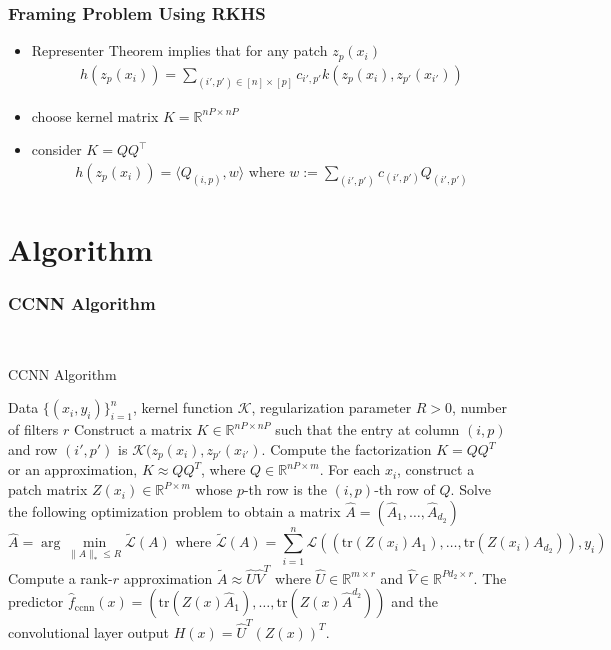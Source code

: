 \documentclass[hyperref={colorlinks}]{beamer}
\newcommand{\set}[1]{\mathbb{#1}}
\newcommand{\trace}[1]{\mathrm{tr}\left(#1\right)}
\begin{document}
\begin{frame}
	\frametitle{Framing Problem Using RKHS}
	\begin{itemize}
		\item Representer Theorem implies that for any patch $z_p(x_i)$
		\begin{align*}
			h(z_p(x_i))=\sum\limits_{(i',p')\in[n]\times[p]} c_{i',p'}k(z_p(x_i),z_{p'}(x_{i'}))
		\end{align*}
		\item choose kernel matrix $K=\mathbb{R}^{nP\times nP}$
		\item consider $K=QQ^{\top}$
		\begin{align*}
			h(z_p(x_i))=\langle Q_{(i,p)},w \rangle \text{ where } w:=\sum\limits_{(i',p')} c_{(i',p')}Q_{(i',p')}
		\end{align*}
	\end{itemize}
\end{frame}

\section{Algorithm}
\begin{frame}
	\frametitle{CCNN Algorithm}
	~
	\begin{algorithm}[H]
		\caption{CCNN Algorithm}
		\label{alg:ccnn-algorithm}
		\footnotesize
		\begin{algorithmic}[1]
			\REQUIRE Data $\{(x_i, y_i)\}_{i = 1}^n$, kernel function $\mathcal{K}$, regularization parameter $R > 0$, number of filters $r$
			\STATE Construct a matrix $K \in \set{R}^{nP \times nP}$ such that the entry at column $(i, p)$ and row $(i', p')$ is $\mathcal{K}(z_p(x_i), z_{p'}(x_{i'})$. Compute the factorization $K = QQ^T$ or an approximation, $K \approx QQ^T$, where $Q \in \set{R}^{nP \times m}$.
			\STATE For each $x_i$, construct a patch matrix $Z(x_i) \in \set{R}^{P \times m}$ whose $p$-th row is the $(i, p)$-th row of $Q$.
			\STATE Solve the following optimization problem to obtain a matrix $\hat{A} = (\hat{A}_1, \ldots, \hat{A}_{d_2})$
			$$\hat{A} = \arg \min_{\|A\|_* \leq R} \tilde{\mathcal{L}}(A) \text{ where } \tilde{\mathcal{L}}(A) = \sum_{i = 1}^n \mathcal{L}\left((\trace{Z(x_i) A_1}, \ldots, \trace{Z(x_i) A_{d_2}}), y_i\right)$$
			\STATE Compute a rank-$r$ approximation $\tilde{A} \approx \hat{U} \hat{V}^T$ where $\hat{U} \in \set{R}^{m \times r}$ and $\hat{V} \in \set{R}^{Pd_2 \times r}$.
			\RETURN The predictor $\hat{f}_{\text{ccnn}}(x) = \left(\trace{Z(x) \hat{A}_1}, \ldots, \trace{Z(x) \hat{A}^{d_2}}\right)$ and the convolutional layer output $H(x) = \hat{U}^T (Z(x))^T$.
		\end{algorithmic}
	\end{algorithm}
\end{frame}
\end{document}
